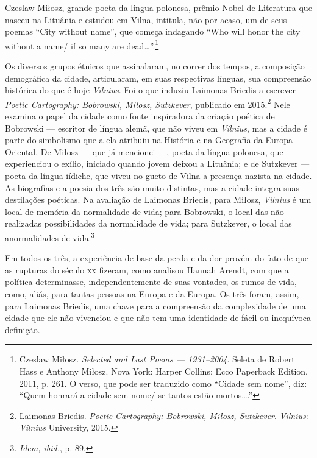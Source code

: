 Czeslaw Miłosz, grande poeta da língua polonesa, prêmio Nobel de
Literatura que nasceu na Lituânia e estudou em Vilna, intitula, não por
acaso, um de seus poemas ``City without name'', que começa indagando
``Who will honor the city without a name/ if so many are
dead\ldots{}''.\footnote{Czeslaw Miłosz. \textit{Selected and Last Poems ---
  1931--2004}. Seleta de Robert Hass e Anthony Miłosz. Nova York: Harper
  Collins; Ecco Paperback Edition, 2011, p. 261. O verso, que pode ser traduzido como ``Cidade sem nome'', 
  diz: ``Quem honrará a cidade sem nome/ se tantos estão mortos\dots{}.''}

Os diversos grupos étnicos que assinalaram, no correr dos tempos, a
composição demográfica da cidade, articularam, em suas respectivas
línguas, sua compreensão histórica do que é hoje \textit{Vilnius}. Foi o que
induziu Laimonas Briedis a escrever \textit{Poetic Cartography:
 Bobrowski, Miłosz, Sutzkever}, publicado em 2015.\footnote{Laimonas Briedis.
  \textit{Poetic Cartography: Bobrowski, Miłosz, Sutzkever}. \textit{Vilnius}: \textit{Vilnius} University, 2015.} Nele examina
o papel da cidade como fonte inspiradora da criação poética de Bobrowski
--- escritor de língua alemã, que não viveu em \textit{Vilnius}, mas a cidade é
parte do simbolismo que a ela atribuiu na História e na Geografia da
Europa Oriental. De Miłosz --- que já mencionei ---, poeta da língua
polonesa, que experienciou o exílio, iniciado quando jovem deixou a
Lituânia; e de Sutzkever --- poeta da língua iídiche, que viveu no gueto de
Vilna a presença nazista na cidade. As biografias e a poesia dos três
são muito distintas, mas a cidade integra suas destilações poéticas. Na
avaliação de Laimonas Briedis, para Miłosz, \textit{Vilnius} é um local de
memória da normalidade de vida; para Bobrowski, o local das não
realizadas possibilidades da normalidade de vida; para Sutzkever, o
local das anormalidades de vida.\footnote{\textit{Idem, ibid.}, p. 89.}

Em todos os três, a experiência de base da perda e da dor provém do fato
de que as rupturas do século \textsc{xx} fizeram, como analisou Hannah Arendt,
com que a política determinasse, independentemente de suas vontades, os
rumos de vida, como, aliás, para tantas pessoas na Europa e da Europa.
Os três foram, assim, para Laimonas Briedis, uma chave para a
compreensão da complexidade de uma cidade que ele não vivenciou e que
não tem uma identidade de fácil ou inequívoca definição.

